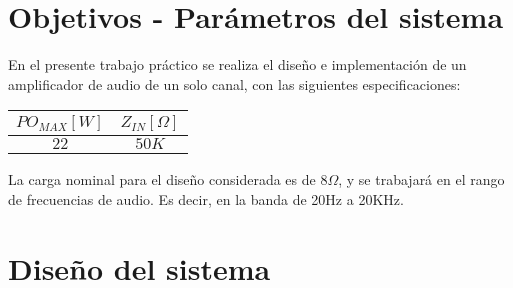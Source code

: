 



\tableofcontents
\newpage

\section{Objetivos - Parámetros del sistema}

En el presente trabajo práctico se realiza el diseño e implementación de un amplificador de audio de un solo canal, con las siguientes especificaciones:

\begin{center}
\begin{tabular}{|c|c|}
\hline 
$PO_{MAX}[W]$ & $Z_{IN}[\Omega]$\\
\hline 
\hline 
$22$ & $50K$\\
\hline 
\end{tabular}
\end{center}

La carga nominal para el diseño considerada es de $8\Omega$, y se trabajará en el rango de frecuencias de audio. Es decir, en la banda de 20Hz a 20KHz.

\section{Diseño del sistema}

